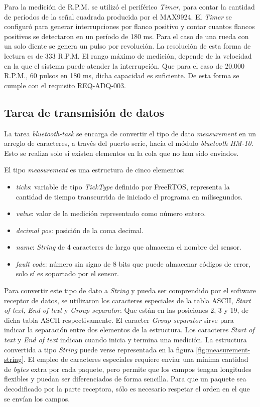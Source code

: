 Para la medición de R.P.M. se utilizó el periférico \textit{Timer}, para contar la cantidad de períodos de la señal cuadrada producida por el MAX9924. El \textit{Timer} se configuró para generar interrupciones por flanco positivo y contar cuantos flancos positivos se detectaron en un período de 180 ms. Para el caso de una rueda con un solo diente se genera un pulso por revolución. La resolución de esta forma de lectura es de 333 R.P.M. El rango máximo de medición, depende de la velocidad en la que el sistema puede atender la interrupción. Que para el caso de 20.000 R.P.M., 60 pulsos en 180 ms, dicha capacidad es suficiente. De esta forma se cumple con el requisito REQ-ADQ-003.

\subsection{Tarea de transmisión de datos}

La tarea \textit{bluetooth-task} se encarga de convertir el tipo de dato \textit{measurement} en un arreglo de caracteres, a través del puerto serie, hacía el módulo \textit{bluetooth} \textit{HM-10}. Esto se realiza solo si existen elementos en la cola que no han sido enviados.

El tipo \textit{measurement} es una estructura de cinco elementos:

\begin{itemize}
\item{\textit{ticks}:} variable de tipo \textit{TickType} definido por FreeRTOS, representa la cantidad de tiempo transcurrida de iniciado el programa en milisegundos.
\item{\textit{value}:} valor de la medición representado como número entero.
\item{\textit{decimal pos}:} posición de la coma decimal.
\item{\textit{name}:} \textit{String} de 4 caracteres de largo que almacena el nombre del sensor.
\item{\textit{fault code}:} número sin signo de 8 bits que puede almacenar códigos de error, solo sí es soportado por el sensor.
\end{itemize}

Para convertir este tipo de dato a \textit{String} y pueda ser comprendido por el software receptor de datos, se utilizaron los caracteres especiales de la tabla ASCII, \textit{Start of text}, \textit{End of text} y \textit{Group separator}. Que están en las posiciones 2, 3 y 19, de dicha tabla ASCII respectivamente. El caracter \textit{Group separator} sirve para indicar la separación entre dos elementos de la estructura. Los caracteres \textit{Start of text} y \textit{End of text} indican cuando inicia y termina una medición. La estructura convertida a tipo \textit{String} puede verse representada en la figura \ref{fig:measurement-string}. El empleo de caracteres especiales requiere enviar una mínima cantidad de \textit{bytes} extra por cada paquete, pero permite que los campos tengan longitudes flexibles y puedan ser diferenciados de forma sencilla. Para que un paquete sea decodificado por la parte receptora, sólo es necesario respetar el orden en el que se envían los campos.

